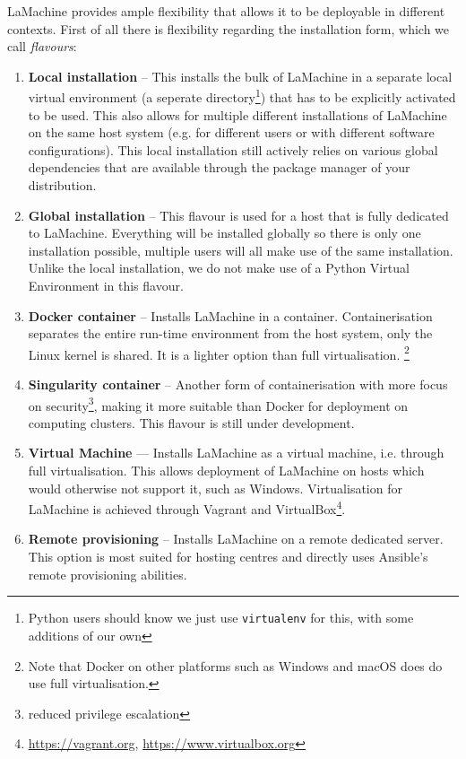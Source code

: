 \documentclass[a4paper,11pt]{article}
\begin{document}
LaMachine provides ample flexibility that allows it to be deployable in different contexts. First of all there is
flexibility regarding the installation form, which we call \emph{flavours}:

\begin{enumerate}
    \item \textbf{Local installation} -- This installs the bulk of LaMachine in a separate local virtual environment (a seperate
        directory\footnote{Python users should know we just use \texttt{virtualenv} for this, with some
        additions of our own}) that has to be explicitly activated to be used. This also allows for multiple different installations
        of LaMachine on the same host system (e.g. for different users or with different software configurations).
        This local installation still actively relies on various global dependencies that are available through the
        package manager of your distribution.
    \item \textbf{Global installation} -- This flavour is used for a host that is fully dedicated to LaMachine. Everything will be
        installed globally so there is only one installation possible, multiple users will all make use of the same
        installation. Unlike the local installation, we do not make use of a Python Virtual Environment in this flavour.
    \item \textbf{Docker container} -- Installs LaMachine in a container. Containerisation separates the entire run-time
        environment from the host system, only the Linux kernel is shared. It is a lighter option than full
        virtualisation. \footnote{Note that Docker on other platforms such as Windows and macOS does do use full
        virtualisation.}
    \item \textbf{Singularity container} -- Another form of containerisation with more focus on security\footnote{reduced
        privilege escalation}, making it more suitable than Docker for deployment on computing clusters. This flavour is still under development.
    \item \textbf{Virtual Machine} --- Installs LaMachine as a virtual machine, i.e. through full virtualisation. This allows
        deployment of LaMachine on hosts which would otherwise not support it, such as Windows. Virtualisation for
        LaMachine is achieved through Vagrant and VirtualBox\footnote{\url{https://vagrant.org}, \url{https://www.virtualbox.org}}.
    \item \textbf{Remote provisioning} -- Installs LaMachine on a remote dedicated server. This option is most suited for
        hosting centres and directly uses Ansible's remote provisioning abilities.
\end{enumerate}
\end{document}
